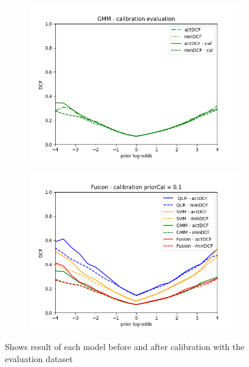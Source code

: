 \begin{figure}[h!]
\begin{subfigure}[b]{0.40\linewidth}
        \label{fig:SVMEvaluation}
    \end{subfigure}
    \begin{subfigure}[b]{0.40\linewidth}
        \includegraphics[width=\linewidth]{Lab/11. Lab 11/Images/Evaluation/03. GMM}
        \label{fig:GMMEvaluation}
    \end{subfigure}
    \begin{subfigure}[b]{0.40\linewidth}
        \includegraphics[width=\linewidth]{Lab/11. Lab 11/Images/Evaluation/04. Fusion}
        \label{fig:FusionEvaluation}
    \end{subfigure}
    \caption{Shows result of each model before and after calibration with the evaluation dataset}
    \label{fig:BestConfigurationCalibrationEvaluation}
\end{figure}

